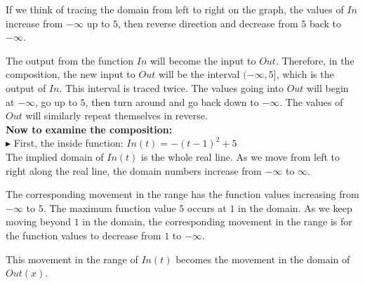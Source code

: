 \documentclass{ximera}
\begin{document}
If we think of tracing the domain from left to right on the graph, the values of $In$ increase from $-\infty$ up to $5$, then reverse direction and decrease from $5$ back to $-\infty$.


The output from the function $In$ will become the input to $Out$.  Therefore, in the composition, the new input to $Out$ will be the interval $(-\infty, 5]$, which is the output of $In$. This interval is traced twice. The values going into $Out$ will begin at $-\infty$, go up to $5$, then turn around and go back down to $-\infty$. The values of $Out$ will similarly repeat themselves in reverse.\\






\textbf{\textcolor{purple!85!blue}{Now to examine the composition:}} \\



\textbf{\textcolor{blue!75!black}{$\blacktriangleright$}}   First, the inside function: $In(t) = -(t-1)^2 + 5$ \\

The implied domain of $In(t)$ is the whole real line. As we move from left to right along the real line, the domain numbers increase from $-\infty$ to $\infty$.

The corresponding movement in the range has the function values increasing from $-\infty$ to $5$.  The maximum function value $5$ occurs at $1$ in the domain.  As we keep moving beyond $1$ in the domain, the corresponding movement in the range is for the function values to decrease from $1$ to $-\infty$.


This movement in the range of $In(t)$ becomes the movement in the domain of $Out(x)$. \\
\end{document}
